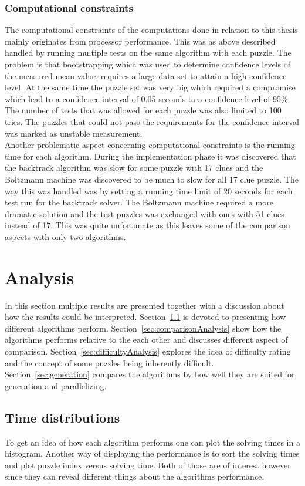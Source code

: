 \documentclass[a4paper,11pt]{kth-mag}
\begin{document}
\FloatBarrier
\subsection{Computational constraints}
The computational constraints of the computations done in relation to this thesis mainly originates from processor performance.
This was as above described handled by running multiple tests on the same algorithm with each puzzle.
The problem is that bootstrapping which was used to determine confidence levels of the measured mean value, requires a large data set to attain a high confidence level. 
At the same time the puzzle set was very big which required a compromise which lead to a confidence interval of 0.05 seconds to a confidence level of 95\%. The number of tests that was allowed for each puzzle was also limited to 100 tries.
The puzzles that could not pass the requirements for the confidence interval was marked as unstable measurement.
\\
Another problematic aspect concerning computational constraints is the running time for each algorithm.
During the implementation phase it was discovered that the backtrack algorithm was slow for some puzzle with 17 clues and the Boltzmann machine was discovered to be much to slow for all 17 clue puzzle.
The way this was handled was by setting a running time limit of 20 seconds for each test run for the backtrack solver.
The Boltzmann machine required a more dramatic solution and the test puzzles was exchanged with ones with 51 clues instead of 17. 
This was quite unfortunate as this leaves some of the comparison aspects with only two algorithms.

\chapter{Analysis}
In this section multiple results are presented together with a discussion about how the results could be interpreted. 
Section~\ref{sec:timeDistributions} is devoted to presenting how different algorithms perform. 
Section~\ref{sec:comparisonAnalysis} show how the algorithms performs relative to the each other and discusses different aspect of comparison.
Section~\ref{sec:difficultyAnalysis} explores the idea of difficulty rating and the concept of some puzzles being inherently difficult.
Section~\ref{sec:generation} compares the algorithms by how well they are suited for generation and parallelizing.

\FloatBarrier
\section{Time distributions}
\label{sec:timeDistributions}
To get an idea of how each algorithm performs one can plot the solving times in a histogram. 
Another way of displaying the performance is to sort the solving times and plot puzzle index versus solving time. 
Both of those are of interest however since they can reveal different things about the algorithms performance. 
 
\end{document}

